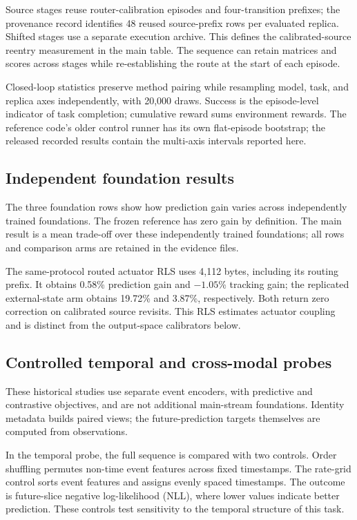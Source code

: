 Source stages reuse router-calibration episodes and four-transition prefixes;
the provenance record identifies 48 reused source-prefix rows per evaluated
replica. Shifted stages use a separate execution archive. This defines the
calibrated-source reentry measurement in the main table. The sequence can
retain matrices and scores across stages while re-establishing the route at
the start of each episode.

Closed-loop statistics preserve method pairing while resampling model, task,
and replica axes independently, with 20,000 draws. Success is the episode-level
indicator of task completion; cumulative reward sums environment rewards.
The reference code's older control runner has its own flat-episode bootstrap;
the released recorded results contain the multi-axis intervals reported here.

\subsection{Independent foundation results}

The three foundation rows show how prediction gain varies across independently
trained foundations. The frozen reference has zero gain by definition. The main result is a
mean trade-off over these independently trained foundations; all rows and
comparison arms are retained in the evidence files.

The same-protocol routed actuator RLS uses 4,112 bytes, including its routing
prefix. It obtains 0.58\% prediction gain and $-1.05$\% tracking gain; the
replicated external-state arm obtains 19.72\% and 3.87\%, respectively.
Both return zero correction on calibrated source revisits. This RLS estimates
actuator coupling and is distinct from the output-space calibrators below.

\subsection{Controlled temporal and cross-modal probes}
\label{app:probes}
These historical studies use separate event encoders, with predictive and
contrastive objectives, and are not additional main-stream foundations.
Identity metadata builds paired views; the future-prediction targets themselves
are computed from observations.

In the temporal probe, the full sequence is compared with two controls.
Order shuffling permutes non-time event features across fixed timestamps.
The rate-grid control sorts event features and assigns evenly spaced
timestamps. The outcome is future-slice negative log-likelihood (NLL), where
lower values indicate better prediction. These controls test sensitivity to
the temporal structure of this task.

